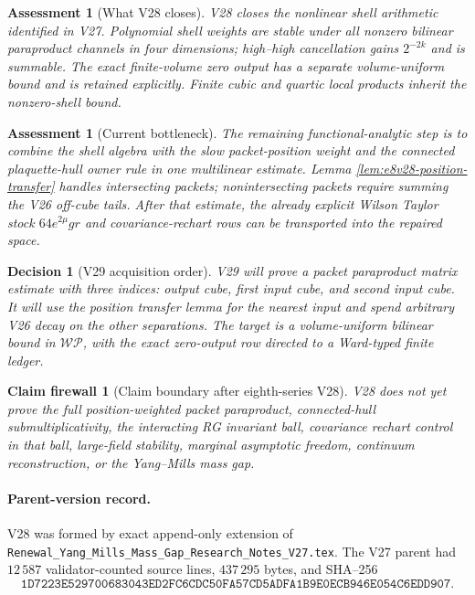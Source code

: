 \documentclass[11pt,oneside]{book}
\newtheorem{assessment}[theorem]{Assessment}
\newtheorem{firewall}[theorem]{Claim firewall}
\newtheorem{decision}[theorem]{Decision}
\theoremstyle{definition}
\theoremstyle{remark}
\begin{document}
\begin{assessment}[What V28 closes]
\label{ass:e8v28-closes}
V28 closes the nonlinear \emph{shell} arithmetic identified in V27.
Polynomial shell weights are stable under all nonzero bilinear
paraproduct channels in four dimensions; high--high cancellation
gains \(2^{-2k}\) and is summable.  The exact finite-volume zero output
has a separate volume-uniform bound and is retained explicitly.
Finite cubic and quartic local products inherit the nonzero-shell
bound.
\end{assessment}

\begin{assessment}[Current bottleneck]
\label{ass:e8v28-remains}
The remaining functional-analytic step is to combine the shell
algebra with the slow packet-position weight and the connected
plaquette-hull owner rule in one multilinear estimate.  Lemma
\ref{lem:e8v28-position-transfer} handles intersecting packets;
nonintersecting packets require summing the V26 off-cube tails.
After that estimate, the already explicit Wilson Taylor stock
\(64e^{2\mu}gr\) and covariance-rechart rows can be transported into
the repaired space.
\end{assessment}

\begin{decision}[V29 acquisition order]
\label{dec:e8v28-v29}
V29 will prove a packet paraproduct matrix estimate with three
indices: output cube, first input cube, and second input cube.  It
will use the position transfer lemma for the nearest input and spend
arbitrary V26 decay on the other separations.  The target is a
volume-uniform bilinear bound in \(\mathscr{WP}\), with the exact
zero-output row directed to a Ward-typed finite ledger.
\end{decision}

\begin{firewall}[Claim boundary after eighth-series V28]
\label{fire:e8v28-claim}
V28 does not yet prove the full position-weighted packet
paraproduct, connected-hull submultiplicativity, the interacting RG
invariant ball, covariance rechart control in that ball, large-field
stability, marginal asymptotic freedom, continuum reconstruction, or
the Yang--Mills mass gap.
\end{firewall}

\paragraph{Parent-version record.}
V28 was formed by exact append-only extension of
\texttt{Renewal\_Yang\_Mills\_Mass\_Gap\_Research\_Notes\_V27.tex}.
The V27 parent had \(12\,587\) validator-counted source lines,
\(437\,295\) bytes, and SHA--256
\[
\texttt{1D7223E529700683043ED2FC6CDC50FA57CD5ADFA1B9E0ECB946E054C6EDD907}.
\]
\end{document}
